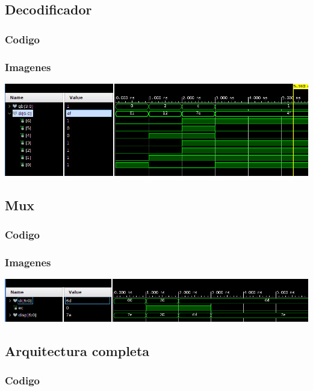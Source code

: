 \documentclass[8pt,executivepaper]{article}
\begin{document}
\subsection{Decodificador}
\subsubsection{Codigo}

\subsubsection{Imagenes}
\begin{center}
  \includegraphics[scale=0.33]{img/decodificador.png}
\end{center}

\subsection{Mux}
\subsubsection{Codigo}

\subsubsection{Imagenes}
\begin{center}
  \includegraphics[scale=0.33]{img/muxD.png}
\end{center}

\subsection{Arquitectura completa}
\subsubsection{Codigo}

\end{document}
